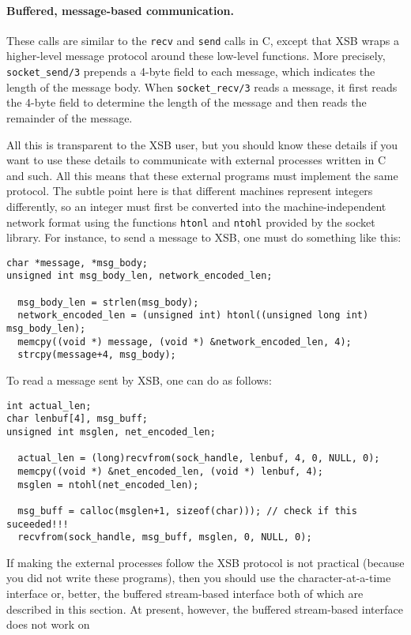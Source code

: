 \paragraph{Buffered, message-based communication.}
These calls are similar to the {\tt recv} and {\tt send} calls in C, except
that XSB wraps a higher-level message protocol around these low-level
functions. More precisely, {\tt socket\_send/3} prepends a 4-byte field
to each message, which indicates the length of the message
body. When {\tt socket\_recv/3} reads a message, it first reads the 4-byte
field to determine the length of the message and then reads the remainder
of the message. 

All this is transparent to the XSB user, but you should know these details
if you want to use these details to communicate with external processes
written in C and such. All this means that these external programs must
implement the same protocol. The subtle point here is that different
machines represent integers differently, so an integer must first be
converted into the machine-independent network format using the functions
{\tt htonl} and {\tt ntohl} provided by the socket library. For instance,
to send a message to XSB, one must do something like this:
\begin{verbatim}
char *message, *msg_body;
unsigned int msg_body_len, network_encoded_len;

  msg_body_len = strlen(msg_body);
  network_encoded_len = (unsigned int) htonl((unsigned long int) msg_body_len);
  memcpy((void *) message, (void *) &network_encoded_len, 4);
  strcpy(message+4, msg_body);
\end{verbatim}
To read a message sent by XSB, one can do as follows:
\begin{verbatim}
int actual_len;
char lenbuf[4], msg_buff;
unsigned int msglen, net_encoded_len;  

  actual_len = (long)recvfrom(sock_handle, lenbuf, 4, 0, NULL, 0);
  memcpy((void *) &net_encoded_len, (void *) lenbuf, 4);
  msglen = ntohl(net_encoded_len);

  msg_buff = calloc(msglen+1, sizeof(char))); // check if this suceeded!!!
  recvfrom(sock_handle, msg_buff, msglen, 0, NULL, 0);
\end{verbatim}
If making the external processes follow the XSB protocol is not practical
(because you did not write these programs), then you should use the
character-at-a-time interface or, better, the buffered
stream-based interface both of which are described in this section.
At present, however, the buffered stream-based interface does not work on
